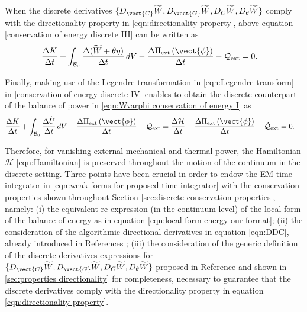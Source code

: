 {{When the discrete derivatives $\{D_{\vect{C}}\widetilde{W},D_{\vect{G}}\widetilde{W},D_{{C}}\widetilde{W},D_{\theta}\widetilde{W}\}$ comply with the directionality property in \eqref{eqn:directionality property}, above equation \eqref{conservation of energy discrete III} can be written as
%
\begin{equation}\label{conservation of energy discrete IV}
\begin{aligned}
&\frac{\Delta K}{\Delta t} + \int_{\mathcal{B}_0}\frac{\Delta (\widetilde{W}+\theta\eta)}{\Delta t}\,dV- \frac{\Delta\Pi_{\text{ext}}\left(\vect{\phi}\right)}{\Delta t} - \dot{\mathcal{Q}}_{\text{ext}}= 0.
%
\end{aligned}
\end{equation}
 
Finally, making use of the Legendre transformation in \eqref{eqn:Legendre transform} in \eqref{conservation of energy discrete IV} enables to obtain the discrete counterpart of the balance of power in \eqref{eqn:Wvarphi conservation of energy I} as
%
\begin{equation}\label{conservation of energy discrete V}
\begin{aligned}
&\frac{\Delta K}{\Delta t} + \int_{\mathcal{B}_0}\frac{\Delta \widetilde{U}}{\Delta t}\,dV- \frac{\Delta\Pi_{\text{ext}}\left(\vect{\phi}\right)}{\Delta t} - \mathcal{Q}_{\text{ext}}=\frac{\Delta\mathcal{H}}{\Delta t}  - \frac{\Delta\Pi_{\text{ext}}\left(\vect{\phi}\right)}{\Delta t} - \dot{\mathcal{Q}}_{\text{ext}} = 0.
%
\end{aligned}
\end{equation}


Therefore, for vanishing external mechanical and thermal power, the Hamiltonian $\mathcal{H}$ \eqref{eqn:Hamiltonian} is preserved throughout the motion of the continuum in the discrete setting. 
Three points have been crucial in order to endow the EM time integrator in \eqref{eqn:weak forms for proposed time integrator} with the conservation properties shown throughout Section \ref{sec:discrete conservation properties}, namely: 
(i) the equivalent re-expression (in the continuum level) of the local form of the balance of energy as in equation \eqref{eqn:local form energy our format};
(ii) the consideration of the algorithmic directional derivatives in equation \eqref{eqn:DDC}, already introduced in References \cite{Betsch2018Thermo,EM_Electro_1}; 
(iii) the consideration of the generic definition of the discrete derivatives expressions for $\{D_{\vect{C}}\widetilde{W},D_{\vect{G}}\widetilde{W},D_{{C}}\widetilde{W},D_{\theta}\widetilde{W}\}$ proposed in Reference \cite{Betsch2018Thermo} and shown in \ref{sec:properties directionality} for completeness, necessary to guarantee that the discrete derivatives comply with the directionality property in equation \eqref{eqn:directionality property}.


}}
